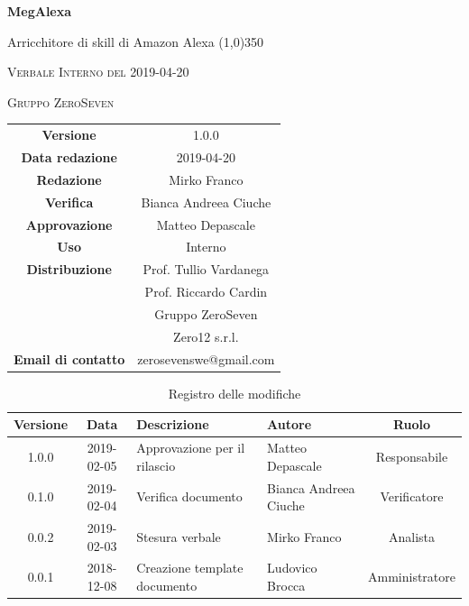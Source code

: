\documentclass[a4paper,12pt]{article}
\author{Bianca Andreea Ciuche}
\date{2019-04-20}
\begin{document}
	\begin{titlepage}
		\centering
		{\huge\bfseries MegAlexa\par}
		Arricchitore di skill di Amazon Alexa
		\line(1,0){350} \\
		{\scshape\LARGE Verbale Interno del 2019-04-20 \par}
		\vspace{1cm}
		{\scshape Gruppo ZeroSeven \par}
		\logo
		\begin{tabular}{c|c}
			{\hfill \textbf{Versione}} 			& 1.0.0				\\
			{\hfill\textbf{Data redazione}} 	& 2019-04-20		\\ 
			{\hfill\textbf{Redazione}} 			&  	Mirko Franco	\\ 
			{\hfill\textbf{Verifica}} 				&  	  	Bianca Andreea Ciuche\\ 
			{\hfill\textbf{Approvazione}} 		&  	Matteo Depascale \\ 
			{\hfill\textbf{Uso}} 					& 	Interno	\\ 
			{\hfill\textbf{Distribuzione}} 			& 			Prof. Tullio Vardanega \\ & Prof. Riccardo Cardin \\ & Gruppo ZeroSeven \\ & Zero12 s.r.l.	\\ 
			{\hfill\textbf{Email di contatto}} & zerosevenswe@gmail.com \\
		\end{tabular}
	\end{titlepage}
	
	
	
	\label{LastFrontPage}
	
	
	\newpage
	\cleardoublepage
	\begin{table}[tbph]
		\centering
		\begin{tabularx}{\textwidth}{|c|c|X|X|c|}
			\hline
			\textbf{Versione} & \textbf{Data} & \textbf{Descrizione} & \textbf{Autore} & \textbf{Ruolo} \\
			\hline
			1.0.0 & 2019-02-05 & Approvazione per il rilascio &Matteo Depascale & Responsabile \\
			\hline
			0.1.0 & 2019-02-04 & Verifica documento & Bianca Andreea Ciuche & Verificatore \\
			\hline
			0.0.2 & 2019-02-03 & Stesura verbale &Mirko Franco & Analista \\
			\hline
			0.0.1 & 2018-12-08 & Creazione template documento & Ludovico Brocca & Amministratore\\
			\hline
		\end{tabularx}
		\caption{Registro delle modifiche}
	\end{table}
	\cleardoublepage
	\pagestyle{mymain}
	
\end{document}
